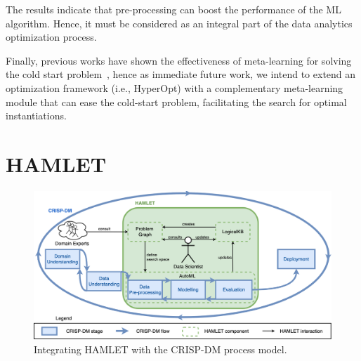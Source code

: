 The results indicate that pre-processing can boost the performance of the ML algorithm. Hence, it must be considered as an integral part of the data analytics optimization process. 

Finally, previous works have shown the effectiveness of meta-learning for solving the cold start problem~\cite{Feurer15AAAI}, hence as immediate future work, we intend to extend an optimization framework (i.e., HyperOpt) with a complementary meta-learning module that can ease the cold-start problem, facilitating the search for optimal instantiations.

\section{HAMLET}

\begin{figure}[t]
    \centering
    \includegraphics[scale=.3]{part-automl/chapter-supervised/img-hamlet/dymmymodel.png}
    \caption{Integrating HAMLET with the CRISP-DM process model.}
    \label{fig:approach}
\end{figure}

